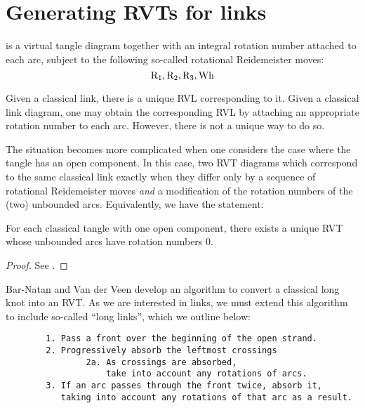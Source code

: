 \documentclass{article}
\begin{document}
\section{Generating \acp{RVT} for links}

\begin{definition}[\ac{RVT}]
         is a virtual tangle diagram together with an integral rotation
        number attached to each arc, subject to the following so-called
        rotational Reidemeister moves:
        \begin{equation}
                \Reid1, \Reid2, \Reid3, \text{Wh} %
        \end{equation}
\end{definition}

Given a classical link, there is a unique \ac{RVL} corresponding to it. Given a
classical link diagram, one may obtain the corresponding \ac{RVL} by attaching
an appropriate rotation number to each arc. However, there is not a unique way
to do so.

The situation becomes more complicated when one considers the case where the
tangle has an open component. In this case, two \ac{RVT} diagrams which
correspond to the same classical link exactly when they differ only by a
sequence of rotational Reidemeister moves \emph{and} a modification of the
rotation numbers of the (two) unbounded arcs. Equivalently, we have the
statement:

\begin{lemma}
        For each classical tangle with one open component, there exists a unique
        \ac{RVT} whose unbounded arcs have rotation numbers $0$.
\end{lemma}
\begin{proof}
        See \cite{BV}.
\end{proof}

Bar-Natan and Van der Veen develop an algorithm to convert a classical long knot
into an \ac{RVT}. As we are interested in links, we must extend this algorithm
to include so-called \enquote{long links}, which we outline below:
\begin{verbatim}
        1. Pass a front over the beginning of the open strand.
        2. Progressively absorb the leftmost crossings 
                2a. As crossings are absorbed,
                    take into account any rotations of arcs.
        3. If an arc passes through the front twice, absorb it,
           taking into account any rotations of that arc as a result.
\end{verbatim}
\end{document}
